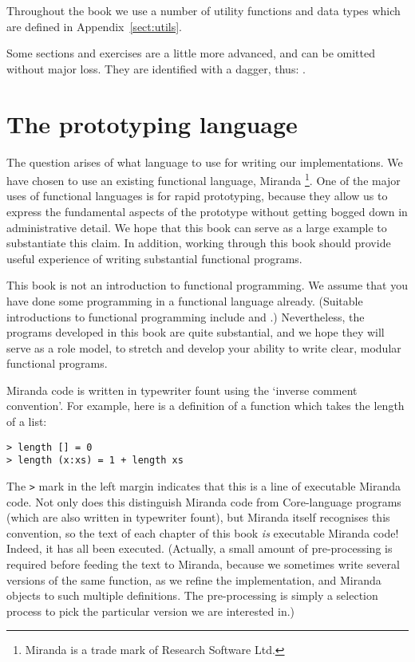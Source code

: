 Throughout the book we use a number of utility functions and data types
which are defined in Appendix~\ref{sect:utils}.

Some sections and exercises
are a little more advanced, and can be omitted without
major loss.  They are identified with a dagger, thus: \advanced.

\section*{The prototyping language}

The question arises of what language to use for writing our implementations.
We have chosen to use an existing functional language,
Miranda%
\footnote{Miranda is a trade mark of Research Software Ltd.}.
One of the major uses of functional languages is for rapid
prototyping, because they allow us to express the fundamental aspects of
the prototype without getting bogged down in administrative detail.
We hope that this book can serve as a large example to substantiate
this claim.  In addition, working through this book should provide
useful experience of writing substantial functional programs.

This book is not an introduction to functional programming.
We assume that you have done some programming in a functional language
already.
(Suitable introductions to functional programming include \cite{BirdWadler}
and \cite{Hoyler}.)
Nevertheless, the programs developed in this book are quite substantial,
and we hope they will serve as a role model, to
stretch and develop your ability to write clear,
modular functional programs.

Miranda code is written in typewriter fount
using the `inverse comment convention'.
For example, here is a definition of a function which takes the length of
a list:
\begin{verbatim}
> length [] = 0
> length (x:xs) = 1 + length xs
\end{verbatim}
%
%
The \mbox{\tt >} mark in the left margin indicates that this is a line of
executable Miranda code.
Not only does this distinguish Miranda code from Core-language programs
(which are also written in typewriter fount), but Miranda itself recognises
this convention, so the text of each chapter of
this book {\em is} executable Miranda code!
Indeed, it has all been executed.
(Actually, a small amount of pre-processing is required before feeding the
text to Miranda, because we
sometimes write several versions of the same function, as we refine
the implementation, and Miranda objects to such multiple definitions.
The pre-processing is simply a selection process to pick the particular
version we are interested in.)


